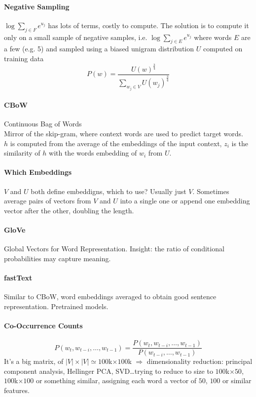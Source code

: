 \documentclass[10pt]{report}
\begin{document}
\paragraph{Negative Sampling} $\log\sum_{j\in F}e^{u_j}$ has lots of terms, costly to compute. The solution is to compute it only on a small sample of negative samples, i.e. $\log\sum_{j\in E}e^{u_j}$ where words $E$ are a few (e.g. 5) and sampled using a biased unigram distribution $U$ computed on training data
$$P(w) = \frac{U(w)^{\frac{3}{4}}}{\sum_{w_j\in V}U(w_j)^{\frac{3}{4}}}$$
\paragraph{CBoW} Continuous Bag of Words\\
Mirror of the skip-gram, where context words are used to predict target words.\\
$h$ is computed from the average of the embeddings of the input context, $z_i$ is the similarity of $h$ with the words embedding of $w_i$ from $U$.
\paragraph{Which Embeddings} $V$ and $U$ both define embeddigns, which to use? Usually just $V$. Sometimes average pairs of vectors from $V$ and $U$ into a single one or append one embedding vector after the other, doubling the length.
\paragraph{GloVe} Global Vectors for Word Representation. Insight: the ratio of conditional probabilities may capture meaning.
\paragraph{fastText} Similar to CBoW, word embeddings averaged to obtain good sentence representation. Pretrained models.
\paragraph{Co-Occurrence Counts}
$$P(w_t,w_{t-i},\ldots,w_{t-1}) = \frac{P(w_t,w_{t-i},\ldots,w_{t-1})}{P(w_{t-i},\ldots,w_{t-1})}$$
It's a big matrix, of $|V|\times|V|\simeq 100$k$\times100$k $\Rightarrow$ dimensionality reduction: principal component analysis, Hellinger PCA, SVD\ldots trying to reduce to size to $100$k$\times 50$, $100$k$\times 100$ or something similar, assigning each word a vector of $50$, $100$ or similar features.
\end{document}
